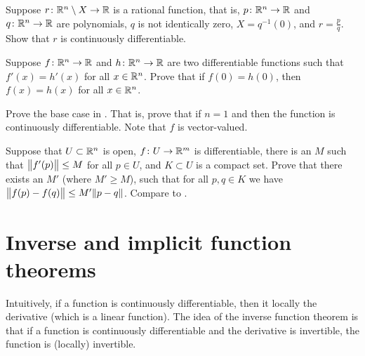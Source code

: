 \begin{exercise}
Suppose $r \colon {\mathbb{R}}^n \setminus X \to {\mathbb{R}}$ is a rational function, that is,
$p \colon {\mathbb{R}}^n \to {\mathbb{R}}$ and
$q \colon {\mathbb{R}}^n \to {\mathbb{R}}$ are polynomials,
$q$ is not identically zero,
$X = q^{-1}(0)$, and
$r = \frac{p}{q}$.
Show that $r$ is continuously differentiable.
\end{exercise}

\begin{exercise}
Suppose $f \colon {\mathbb{R}}^n \to {\mathbb{R}}$ and $h \colon {\mathbb{R}}^n \to {\mathbb{R}}$ are two 
differentiable functions such that $f'(x) = h'(x)$ for all $x \in {\mathbb{R}}^n$.
Prove that
if $f(0) = h(0)$, then $f(x) = h(x)$ for all $x \in {\mathbb{R}}^n$.
\end{exercise}

\begin{exercise}
Prove the base case
in .  That is, prove that
if $n=1$ and 
 then the function is continuously
differentiable.  Note that $f$ is vector-valued.
\end{exercise}

\begin{exercise}
Suppose that $U \subset {\mathbb{R}}^n$ is open, $f \colon U \to {\mathbb{R}}^m$ is
differentiable, there is an $M$ such that $\bigl\lVert {f'(p)} \bigr\rVert \leq M$
for all $p \in U$, and $K \subset U$ is a compact set.  Prove that
there exists an $M'$ (where $M' \geq M$), such that
for all $p,q \in K$ we have $\bigl\lVert {f(p)-f(q)} \bigr\rVert \leq M' \lVert {p-q} \rVert$.
Compare to .
\end{exercise}



\sectionnewpage
\section{Inverse and implicit function theorems}
\label{sec:svinvfuncthm}



Intuitively, if a function is continuously differentiable, then it
locally  the derivative (which is a linear function).
The idea of the inverse function theorem is that if a function is
continuously differentiable and the derivative is invertible, the function is
(locally) invertible.


